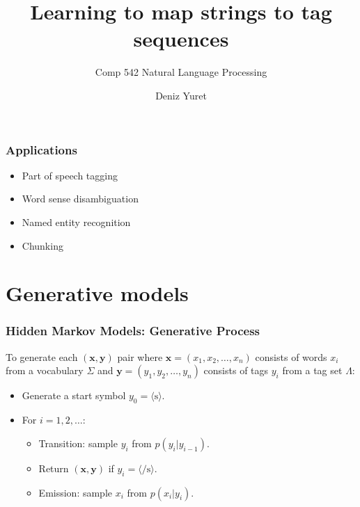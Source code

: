 \documentclass[ignorenonframetext,plain,fleqn]{beamer}
\title{Learning to map strings to tag sequences}
\subtitle{Comp 542 Natural Language Processing}
\author{Deniz Yuret}
\renewcommand{\vec}{\mathbf}
\newcommand{\sos}{\mbox{$\langle$s$\rangle$}}
\newcommand{\eos}{\mbox{$\langle/$s$\rangle$}}
\begin{document}
\begin{frame}
\maketitle
\end{frame}

\begin{frame}\frametitle{Applications}
\begin{itemize}
\item Part of speech tagging %
\item Word sense disambiguation %
\item Named entity recognition %
\item Chunking %
\end{itemize}
\end{frame}

\section{Generative models}
\frame{\sectionpage}

\begin{frame}\frametitle{Hidden Markov Models: Generative Process}
To generate each $(\vec{x},\vec{y})$ pair where $\vec{x} = (x_1, x_2,
\dots, x_n)$ consists of words $x_i$ from a vocabulary $\Sigma$ and
$\vec{y} = (y_1, y_2, \dots, y_n)$ consists of tags $y_i$ from a tag
set $\Lambda$:
\begin{itemize}
\item Generate a start symbol $y_0=\sos$.
\item For $i=1, 2, \dots$:
\begin{itemize}
\item Transition: sample $y_i$ from $p(y_i|y_{i-1})$.
\item Return $(\vec{x}, \vec{y})$ if $y_i=\eos$.
\item Emission: sample $x_i$ from $p(x_i|y_i)$.
\end{itemize}
\end{itemize}
\end{frame}
\end{document}
